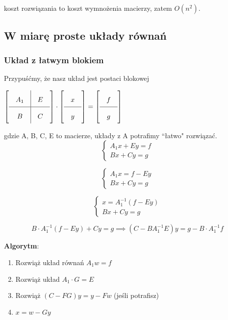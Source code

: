 \documentclass[hidelinks,a4paper,fleqn,oneside]{book}
\begin{document}
koszt rozwiązania to koszt wymnożenia macierzy, zatem  $O(n^2)$.


\subsection{W miarę proste układy równań}

\subsubsection{Układ z łatwym blokiem}

Przypuśćmy, że nasz układ jest postaci blokowej

$\arraycolsep=1em\def\arraystretch{2}
\left[
	\begin{array}{c|c}
		A_1 & E \\ \hline
		B   & C 
	\end{array}
\right] \cdot
\left[
	\begin{array}{c}
		x \\ \hline
		y 
	\end{array}
\right] = 
\left[
	\begin{array}{c}
		f \\ \hline
		g 
	\end{array}
\right]
$

gdzie A, B, C, E to macierze, układy z A potrafimy ``łatwo" rozwiązać.
\[
	\left\{ \begin{array}{l}
	A_1x + Ey = f\\
	Bx + Cy = g
	\end{array} \right.
\]

\[
	\left\{ \begin{array}{l}
	A_1x = f - Ey\\
	Bx + Cy = g
	\end{array} \right.
\]

\[
	\left\{ \begin{array}{l}
	x = A_1^{-1}(f - Ey)\\
	Bx + Cy = g
	\end{array} \right.
\]

\[
	B \cdot A_1^{-1} (f - Ey) + Cy = g \implies (C - BA_1^{-1}E)y = g - B\cdot A_1^{-1}f
\]

\textbf{Algorytm}:

\begin{enumerate}
	\item Rozwiąż układ równań $A_1w = f$
	\item Rozwiąż układ $A_1 \cdot G = E$
	\item Rozwiąż $(C-FG)y = y - Fw$ (jeśli potrafisz)
	\item $x = w - Gy$
\end{enumerate}
\end{document}
